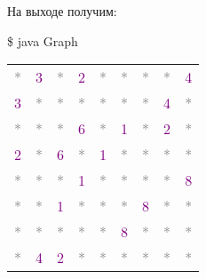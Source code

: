 На выходе получим:

\begin{tcolorbox}
	{
    \$ java Graph \\
    \begin{tabular}{*{9}{c}}
        \textcolor{Gray}{*} & \textcolor{Purple}{3} & \textcolor{Gray}{*} & \textcolor{Purple}{2} & \textcolor{Gray}{*} & \textcolor{Gray}{*} & \textcolor{Gray}{*} & \textcolor{Gray}{*} & \textcolor{Purple}{4} \\
        
        \textcolor{Purple}{3} & \textcolor{Gray}{*} & \textcolor{Gray}{*} & \textcolor{Gray}{*} & \textcolor{Gray}{*} & \textcolor{Gray}{*} & \textcolor{Gray}{*} & \textcolor{Purple}{4} & \textcolor{Gray}{*} \\
        
        \textcolor{Gray}{*} & \textcolor{Gray}{*} & \textcolor{Gray}{*} & \textcolor{Purple}{6} & \textcolor{Gray}{*} & \textcolor{Purple}{1} & \textcolor{Gray}{*} & \textcolor{Purple}{2} & \textcolor{Gray}{*} \\
        
        \textcolor{Purple}{2} & \textcolor{Gray}{*} & \textcolor{Purple}{6} & \textcolor{Gray}{*} & \textcolor{Purple}{1} & \textcolor{Gray}{*} & \textcolor{Gray}{*} & \textcolor{Gray}{*} & \textcolor{Gray}{*} \\
        
        \textcolor{Gray}{*} & \textcolor{Gray}{*} & \textcolor{Gray}{*} & \textcolor{Purple}{1} & \textcolor{Gray}{*} & \textcolor{Gray}{*} & \textcolor{Gray}{*} & \textcolor{Gray}{*} & \textcolor{Purple}{8} \\
        
        \textcolor{Gray}{*} & \textcolor{Gray}{*} & \textcolor{Purple}{1} & \textcolor{Gray}{*} & \textcolor{Gray}{*} & \textcolor{Gray}{*} & \textcolor{Purple}{8} & \textcolor{Gray}{*} & \textcolor{Gray}{*} \\
        
        \textcolor{Gray}{*} & \textcolor{Gray}{*} & \textcolor{Gray}{*} & \textcolor{Gray}{*} & \textcolor{Gray}{*} & \textcolor{Purple}{8} & \textcolor{Gray}{*} & \textcolor{Gray}{*} & \textcolor{Gray}{*} \\
        
        \textcolor{Gray}{*} & \textcolor{Purple}{4} & \textcolor{Purple}{2} & \textcolor{Gray}{*} & \textcolor{Gray}{*} & \textcolor{Gray}{*} & \textcolor{Gray}{*} & \textcolor{Gray}{*} & \textcolor{Gray}{*} \\
        

\end{tabular}}
\end{tcolorbox}
